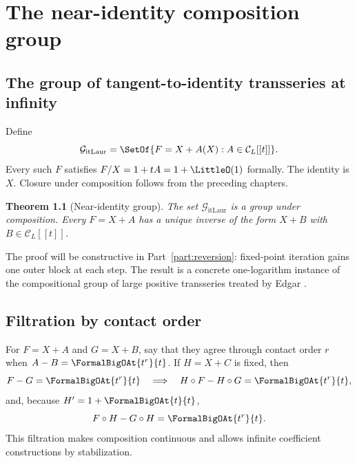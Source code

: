 \documentclass[11pt,oneside]{book}
\newtheorem{theorem}{Theorem}[chapter]
\theoremstyle{definition}
\theoremstyle{remark}
\newcommand{\compose}{\mathbin{\circ}}
\begin{document}
\chapter{The near-identity composition group}
\label{ch:composition-group}

\section{The group of tangent-to-identity transseries at infinity}
Define
\begin{equation}\label{eq:near-id-group}
 \mathcal G_{\mathrm{itLaur}}
 =\SetOf{F=X+A(X):A\in\mathcal C_L[[t]]}.
\end{equation}
Every such $F$ satisfies $F/X=1+tA=1+\LittleO(1)$ formally.  The identity is $X$.
Closure under composition follows from the preceding chapters.

\begin{theorem}[Near-identity group]\label{thm:near-id-group}
The set $\mathcal G_{\mathrm{itLaur}}$ is a group under composition.  Every
$F=X+A$ has a unique inverse of the form $X+B$ with
$B\in\mathcal C_L[[t]]$.
\end{theorem}
The proof will be constructive in Part~\ref{part:reversion}: fixed-point
iteration gains one outer block at each step.  The result is a concrete
one-logarithm instance of the compositional group of large positive
transseries treated by Edgar \cite{EdgarComposition}.

\section{Filtration by contact order}
For $F=X+A$ and $G=X+B$, say that they agree through contact order $r$ when
$A-B=\FormalBigOAt{t^r}{t}$.  If $H=X+C$ is fixed, then
\begin{equation}\label{eq:composition-continuity-left}
 F-G=\FormalBigOAt{t^r}{t}
 \quad\Longrightarrow\quad
 H\compose F-H\compose G=\FormalBigOAt{t^r}{t},
\end{equation}
and, because $H'=1+\FormalBigOAt{t}{t}$,
\begin{equation}\label{eq:composition-continuity-right}
 F\compose H-G\compose H=\FormalBigOAt{t^r}{t}.
\end{equation}
This filtration makes composition continuous and allows infinite coefficient
constructions by stabilization.
\end{document}
